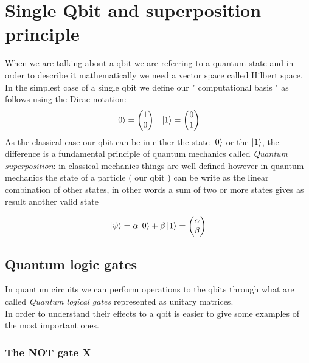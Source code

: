 \chapter{Single Qbit and superposition principle}
When we are talking about a qbit we are referring to a quantum state and in order to describe it mathematically we need a vector space called Hilbert space.\\
In the simplest case of a single qbit we define our " computational basis " as follows using the Dirac notation: 
\begin{align*}
    \ket{0} = \begin{pmatrix}1\\0\end{pmatrix} && \ket{1} = \begin{pmatrix}0 \\ 1\end{pmatrix} 
\end{align*}  
As the classical case our qbit can  be in either the state $\ket{0}$ or the $\ket{1}$, the difference is a fundamental principle of quantum mechanics called \textit{Quantum superposition}: in classical mechanics things are well defined however in quantum mechanics the state of a particle ( our qbit ) can be write as the linear combination of other states, in other words a sum of two or more states gives as result another valid state

\begin{equation*}
    \ket{\psi} = \alpha \ket{0} + \beta \ket{1} = \begin{pmatrix} \alpha \\ \beta \end{pmatrix}
\end{equation*}

\section{Quantum logic gates}
In quantum circuits we can perform operations to the qbits through what are called \textit{Quantum logical gates} represented as unitary matrices. \\
In order to understand their effects to a qbit is easier to give some examples of the most important ones.
\subsection{The NOT gate X}
